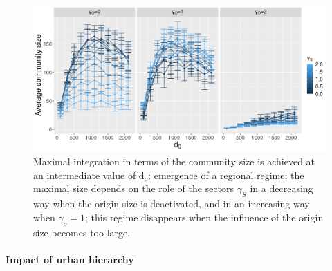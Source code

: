 \documentclass[10pt,letterpaper]{article}
\begin{document}
\begin{figure}
    \includegraphics[width=\textwidth]{figures/Fig6.png}
    \vspace{2cm}
	\caption{Maximal integration in terms of the community size is achieved at an intermediate value of d$_o$: emergence of a regional regime; the maximal size depends on the role of the sectors $\gamma_S$ in a decreasing way when the origin size is deactivated, and in an increasing way when $\gamma_o=1$; this regime disappears when the influence of the origin size becomes too large.\label{fig:fig6}}
\end{figure}


\paragraph{Impact of urban hierarchy}
\end{document}
